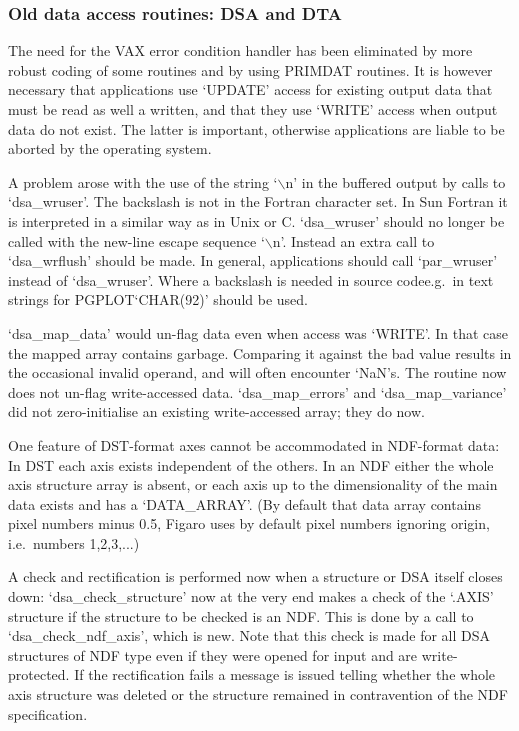 \subsubsection{\label{changessub6}Old data access routines: DSA and DTA}

   The need for the VAX error condition handler has been eliminated by
   more robust coding of some routines and by using PRIMDAT routines. It
   is however necessary that applications use `UPDATE' access for
   existing output data that must be read as well a written, and that
   they use `WRITE' access when output data do not exist. The latter is
   important, otherwise applications are liable to be aborted by the
   operating system.

   A problem arose with the use of the string `$\backslash$n' in the buffered
   output by calls to `dsa\_wruser'. The backslash is not in the Fortran
   character set. In Sun Fortran it is interpreted in a similar way as
   in Unix or C.  `dsa\_wruser' should no longer be called with the
   new-line escape sequence `$\backslash$n'. Instead an extra call to
   `dsa\_wrflush'
   should be made. In general, applications should call `par\_wruser'
   instead of `dsa\_wruser'. Where a backslash is needed in source
   code\latorhtm{---}{-}e.g.\ in text strings for
   PGPLOT\latorhtm{---}{-}`CHAR(92)' should be used.

   `dsa\_map\_data' would un-flag data even when access was `WRITE'. In
   that case the mapped array contains garbage. Comparing it against the
   bad value results in the occasional invalid operand, and will often
   encounter `NaN's. The routine now does not un-flag write-accessed
   data.  `dsa\_map\_errors' and `dsa\_map\_variance' did not
   zero-initialise an existing write-accessed array; they do now.

   One feature of DST-format axes cannot be accommodated in NDF-format
   data: In DST each axis exists independent of the others. In an NDF
   either the whole axis structure array is absent, or each axis up to
   the dimensionality of the main data exists and has a `DATA\_ARRAY'.
   (By default that data array contains pixel numbers minus 0.5, Figaro
   uses by default pixel numbers ignoring origin, i.e.\ numbers
   1,2,3,...)

   A check and rectification is performed now when a
   structure or DSA itself closes down: `dsa\_\-check\-\_structure' now at the
   very end makes a check of the `.AXIS' structure if the structure to
   be checked is an NDF. This is done by a call to `dsa\_check\_ndf\_axis',
   which is new. Note that this check is made for all DSA structures of
   NDF type even if they were opened for input and are write-protected.
   If the rectification fails a message is issued telling whether the
   whole axis structure was deleted or the structure remained in
   contravention of the NDF specification.

